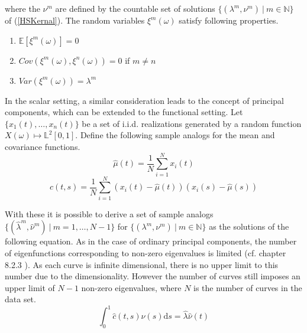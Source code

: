 \documentclass[11pt,twoside,a4paper]{article}
\begin{document}
	where the $\nu^m$ are defined by the countable set of solutions $\{(\lambda^m, \nu^m) \: \vert \: m \in \mathbb{N}\}$ of ({\ref{HSKernal}}). The random variables $\xi^{m}(\omega)$ satisfy following properties. %
	
	
	\begin{multicols}{2}
		\begin{enumerate}
			\item $\mathbb{E}\left[\xi^m(\omega)\right] = 0$
			\item $Cov\left(\xi^m(\omega), \xi^n(\omega)\right) = 0$ if $m \neq n$
			\item $Var\left(\xi^m(\omega)\right) = \lambda^m$
		\end{enumerate}
	\end{multicols}

	In the scalar setting, a similar consideration leads to the concept of principal components, which can be extended to the functional setting. Let $\{x_1(t), \dots, x_n(t)\}$ be a set of i.i.d. realizations generated by a random function $X(\omega) \mapsto \mathbb{L}^2[0,1]$.
	Define the following sample analogs for the mean and covariance functions.
	\begin{equation}
		\hat{\mu}(t) = \frac{1}{N}\sum_{i = 1}^{N}x_i(t)
	\end{equation}
	\begin{equation}
		\hat{c}(t,s) = \frac{1}{N} \sum_{i = 1}^{N} \left(x_i(t) - \hat{\mu}(t)\right) \left(x_i(s) - \hat{\mu}(s)\right)
	\end{equation}
	
	With these it is possible to derive a set of sample analogs $\{(\hat{\lambda}^m, \hat{\nu}^m) \: \vert \: m = 1, \dots, N-1\}$ for $\{(\lambda^m, \nu^m) \: \vert \: m \in \mathbb{N}\}$ as the solutions of the following equation. As in the case of ordinary principal components, the number of eigenfunctions corresponding to non-zero eigenvalues is limited (cf. chapter 8.2.3 \cite{ramsay_functional_2005}). As each curve is infinite dimensional, there is no upper limit to this number due to the dimensionality. However the number of curves still imposes an upper limit of $N-1$ non-zero eigenvalues, where $N$ is the number of curves in the data set.
	\begin{equation}
		\int_{0}^{1}\hat{c}(t,s)\hat{\nu}(s) \mathrm{d}s = \hat{\lambda} \hat{\nu}(t)
	\end{equation}
	
\end{document}
